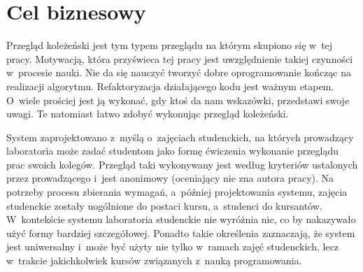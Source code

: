 \section{Cel biznesowy}
Przegląd koleżeński jest tym typem przeglądu na którym skupiono się w~tej pracy. Motywacją, która przyświeca tej pracy jest uwzględnienie takiej czynności w~procesie nauki. Nie da się nauczyć tworzyć dobre oprogramowanie kończąc na realizacji algorytmu. Refaktoryzacja działającego kodu jest ważnym etapem. O~wiele prościej jest ją wykonać, gdy ktoś da nam wskazówki, przedstawi swoje uwagi. Te natomiast łatwo zdobyć wykonując przegląd koleżeński.

\medskip
System zaprojektowano z~myślą o~zajęciach studenckich, na których prowadzący laboratoria może zadać studentom jako formę ćwiczenia wykonanie przeglądu prac swoich kolegów. Przegląd taki wykonywany jest według kryteriów ustalonych przez prowadzącego i~jest anonimowy (oceniający nie zna autora pracy). Na potrzeby procesu zbierania wymagań, a~później projektowania systemu, zajęcia studenckie zostały uogólnione do postaci kursu, a~studenci do kursantów. W~kontekście systemu laboratoria studenckie nie wyróżnia nic, co by nakazywało użyć formy bardziej szczegółowej. Ponadto takie określenia zaznaczają, że system jest uniwersalny i~może być użyty nie tylko w~ramach zajęć studenckich, lecz w~trakcie jakichkolwiek kursów związanych z~nauką programowania.


